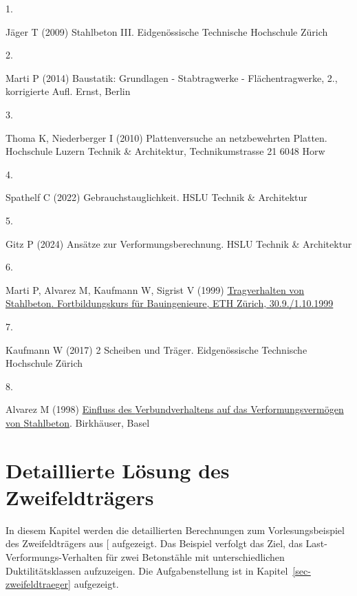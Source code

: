 \documentclass[
  11pt,
  letterpaper,
]{scrreprt}
\newlength{\cslhangindent}
\newlength{\csllabelwidth}
\newenvironment{CSLReferences}[2] %
 {\begin{list}{}{%
  \setlength{\itemindent}{0pt}
  \setlength{\leftmargin}{0pt}
  \setlength{\parsep}{0pt}
  \ifodd #1
   \setlength{\leftmargin}{\cslhangindent}
   \setlength{\itemindent}{-1\cslhangindent}
  \fi
  \setlength{\itemsep}{#2\baselineskip}}}
 {\end{list}}
\newcommand{\CSLLeftMargin}[1]{\parbox[t]{\csllabelwidth}{\strut#1\strut}}
\newcommand{\CSLRightInline}[1]{\parbox[t]{\linewidth - \csllabelwidth}{\strut#1\strut}}
\begin{document}
\label{refs}
\begin{CSLReferences}{0}{1}
\CSLLeftMargin{1. }%
\CSLRightInline{Jäger T (2009) Stahlbeton {III}. Eidgenössische
Technische Hochschule Zürich}

\CSLLeftMargin{2. }%
\CSLRightInline{Marti P (2014) Baustatik: {Grundlagen} - {Stabtragwerke}
- {Flächentragwerke}, 2., korrigierte Aufl. Ernst, Berlin}

\CSLLeftMargin{3. }%
\CSLRightInline{Thoma K, Niederberger I (2010) Plattenversuche an
netzbewehrten {Platten}. Hochschule Luzern Technik \& Architektur,
Technikumstrasse 21 6048 Horw}

\CSLLeftMargin{4. }%
\CSLRightInline{Spathelf C (2022) Gebrauchstauglichkeit. HSLU Technik \&
Architektur}

\CSLLeftMargin{5. }%
\CSLRightInline{Gitz P (2024) Ansätze zur {Verformungsberechnung}. HSLU
Technik \& Architektur}

\CSLLeftMargin{6. }%
\CSLRightInline{Marti P, Alvarez M, Kaufmann W, Sigrist V (1999)
\href{https://doi.org/10.3929/ethz-a-004470343}{Tragverhalten von
{Stahlbeton}. {Fortbildungskurs} für {Bauingenieure}, {ETH} {Zürich},
30.9./1.10.1999}}

\CSLLeftMargin{7. }%
\CSLRightInline{Kaufmann W (2017) 2 {Scheiben} und {Träger}.
Eidgenössische Technische Hochschule Zürich}

\CSLLeftMargin{8. }%
\CSLRightInline{Alvarez M (1998)
\href{https://doi.org/10.3929/ethz-a-002000033}{Einfluss des
{Verbundverhaltens} auf das {Verformungsvermögen} von {Stahlbeton}}.
Birkhäuser, Basel}

\end{CSLReferences}

\cleardoublepage
{}
{}
\appendix

\chapter{Detaillierte Lösung des
Zweifeldträgers}\label{sec-zweifeldtraeger_anhang}

In diesem Kapitel werden die detaillierten Berechnungen zum
Vorlesungsbeispiel des Zweifeldträgers aus
{[}\citeproc{ref-jager_stahlbeton_2009}{1}{]} aufgezeigt. Das Beispiel
verfolgt das Ziel, das Last-Verformungs-Verhalten für zwei Betonstähle
mit unterschiedlichen Duktilitätsklassen aufzuzeigen. Die
Aufgabenstellung ist in Kapitel~\ref{sec-zweifeldtraeger} aufgezeigt.
\end{document}

